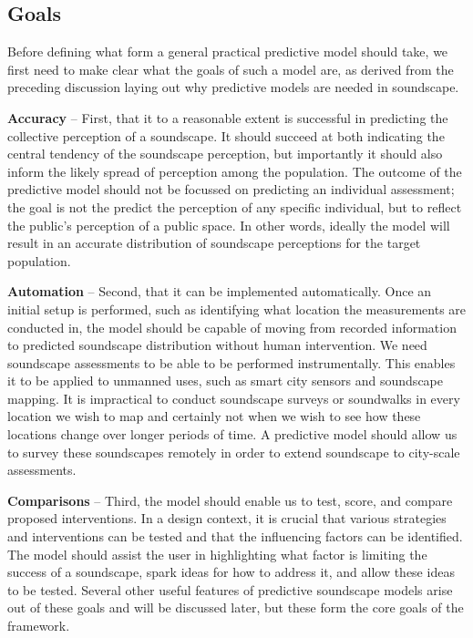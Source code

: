 \documentclass[
  authoryear,
  preprint,
  1p]{elsarticle}
\begin{document}
\subsection{Goals}\label{goals}

Before defining what form a general practical predictive model should
take, we first need to make clear what the goals of such a model are, as
derived from the preceding discussion laying out why predictive models
are needed in soundscape.

\textbf{Accuracy} -- First, that it to a reasonable extent is successful
in predicting the collective perception \citep[see][]{Mitchell2022How}
of a soundscape. It should succeed at both indicating the central
tendency of the soundscape perception, but importantly it should also
inform the likely spread of perception among the population. The outcome
of the predictive model should not be focussed on predicting an
individual assessment; the goal is not the predict the perception of any
specific individual, but to reflect the public's perception of a public
space. In other words, ideally the model will result in an accurate
distribution of soundscape perceptions for the target population.

\textbf{Automation} -- Second, that it can be implemented automatically.
Once an initial setup is performed, such as identifying what location
the measurements are conducted in, the model should be capable of moving
from recorded information to predicted soundscape distribution without
human intervention. We need soundscape assessments to be able to be
performed instrumentally. This enables it to be applied to unmanned
uses, such as smart city sensors and soundscape mapping. It is
impractical to conduct soundscape surveys or soundwalks in every
location we wish to map and certainly not when we wish to see how these
locations change over longer periods of time. A predictive model should
allow us to survey these soundscapes remotely in order to extend
soundscape to city-scale assessments.

\textbf{Comparisons} -- Third, the model should enable us to test,
score, and compare proposed interventions. In a design context, it is
crucial that various strategies and interventions can be tested and that
the influencing factors can be identified. The model should assist the
user in highlighting what factor is limiting the success of a
soundscape, spark ideas for how to address it, and allow these ideas to
be tested. Several other useful features of predictive soundscape models
arise out of these goals and will be discussed later, but these form the
core goals of the framework.
\end{document}
